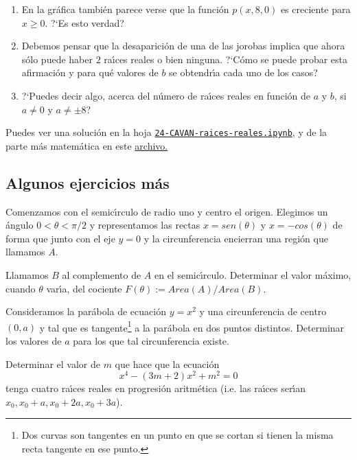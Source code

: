 \begin{enumerate}
\item En la gr\'afica tambi\'en parece verse que la funci\'on $p(x,8,0)$ es
creciente para $x\ge 0$. ?`Es esto verdad?
 
 \item Debemos pensar que la desaparici\'on de una de las jorobas implica que
ahora s\'olo puede haber $2$ ra\'{\i}ces reales o bien ninguna. ?`C\'omo se
puede probar esta afirmaci\'on y para qu\'e valores de $b$ se obtendr\'{\i}a 
cada uno de los casos?

\item ?`Puedes decir algo,  acerca del n\'umero de ra\'{\i}ces reales en
funci\'on de $a$ y $b$, si $a\ne
0$ y $a\ne \pm 8$?
 
\end{enumerate}


Puedes ver una soluci\'on en la hoja 
\href{http://localhost:8888/notebooks/CAVAN/24-CAVAN-raices-reales.ipynb}{\tt 24-CAVAN-raices-reales.ipynb},
y de la parte m\'as matem\'atica en este
\href{http://150.244.21.37/PDFs/CAVAN/un_ejercicio_calculo.pdf}{archivo.}


\subsection{Algunos ejercicios m\'as}

\begin{ejer}
Comenzamos con el semic\'{\i}rculo de radio uno y centro el
origen. Elegimos un \'angulo $0<\theta<\pi/2$ y representamos las rectas
$x=sen(\theta)$ y $x=-cos(\theta)$  de forma que junto con el eje $y=0$ y la
circunferencia encierran una regi\'on que llamamos $A$.

Llamamos $B$ al complemento de $A$ en el semic\'{\i}rculo. {\sc Determinar} el
valor m\'aximo, cuando $\theta$ var\'{\i}a, 
 del cociente $F(\theta):=Area(A)/Area(B)$.
 
\end{ejer}

\begin{ejer}
 Consideramos la par\'abola de ecuaci\'on $y=x^2$ y una
circunferencia de centro $(0,a)$ y tal que es tangente\footnote{Dos curvas son
tangentes en un punto en que se cortan si tienen la misma recta tangente en ese
punto.} a la par\'abola en dos puntos distintos. {\sc Determinar} los valores de
$a$ para los que tal circunferencia existe.
\end{ejer}


\begin{ejer}
Determinar el valor de $m$ que hace que la ecuaci\'on 
\[x^4-(3m+2)x^2+m^2=0\]
\noindent tenga cuatro ra\'{\i}ces reales en progresi\'on aritm\'etica (i.e. las ra\'{\i}ces ser\'{\i}an $x_0,x_0+a,x_0+2a,x_0+3a$).	
\end{ejer}

